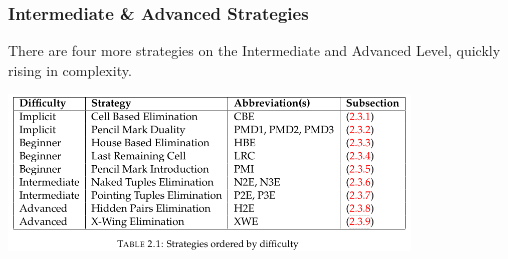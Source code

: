 \documentclass[aspectratio=169, usenames, dvipsnames]{beamer}
\begin{document}
\begin{frame}
\frametitle{Intermediate \& Advanced Strategies}

There are four more strategies on the Intermediate and Advanced Level, quickly rising in complexity.
\bigskip

\begin{center}
\includegraphics[width=0.8\textwidth, keepaspectratio]{images/all_strategies.png} 
\end{center}

\end{frame}
\end{document}
